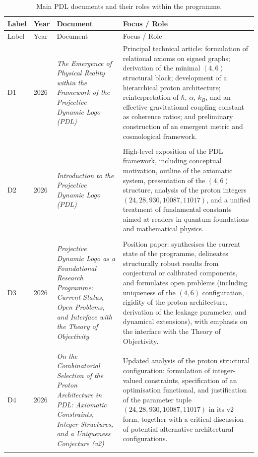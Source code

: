 \documentclass[11pt,a4paper]{article}
\begin{document}
\setlength{\LTpre}{18pt}
\setlength{\LTpost}{0pt}

\begin{longtable}{@{}llL{4cm}p{9.0cm}@{}}
\caption{Main PDL documents and their roles within the programme.}
\label{tab:documents}\\
\toprule
Label & Year & Document & Focus / Role \\
\midrule
\endfirsthead

\toprule
Label & Year & Document & Focus / Role \\
\midrule
\endhead

D1 & 2026 & \textit{The Emergence of Physical Reality within the Framework of the Projective Dynamic Logo (PDL)} &
Principal technical article: formulation of relational axioms on signed graphs; derivation of the minimal $(4,6)$ structural block; development of a hierarchical proton architecture; reinterpretation of $\hbar$, $\alpha$, $k_B$, and an effective gravitational coupling constant as coherence ratios; and preliminary construction of an emergent metric and cosmological framework. \citep{PDL_Main_2026} \\\\[0.5em]

D2 & 2026 & \textit{Introduction to the Projective Dynamic Logo (PDL)} &
High-level exposition of the PDL framework, including conceptual motivation, outline of the axiomatic system, presentation of the $(4,6)$ structure, analysis of the proton integers $(24,28,930,10087,11017)$, and a unified treatment of fundamental constants aimed at readers in quantum foundations and mathematical physics. \citep{PDL_intro} \\\\[0.5em]

D3 & 2026 & \textit{Projective Dynamic Logo as a Foundational Research Programme: Current Status, Open Problems, and Interface with the Theory of Objectivity} &
Position paper: synthesises the current state of the programme, delineates structurally robust results from conjectural or calibrated components, and formulates open problems (including uniqueness of the $(4,6)$ configuration, rigidity of the proton architecture, derivation of the leakage parameter, and dynamical extensions), with emphasis on the interface with the Theory of Objectivity. \citep{PDL_position,PDL_TO_dialogue} \\\\[0.5em]

D4 & 2026 & \textit{On the Combinatorial Selection of the Proton Architecture in PDL: Axiomatic Constraints, Integer Structures, and a Uniqueness Conjecture (v2)} &
Updated analysis of the proton structural configuration: formulation of integer-valued constraints, specification of an optimisation functional, and justification of the parameter tuple $(24,28,930,10087,11017)$ in its v2 form, together with a critical discussion of potential alternative architectural configurations. \citep{Combinatorial_Proton_v2_2026} \\\\[0.5em]


\end{longtable}
\end{document}
